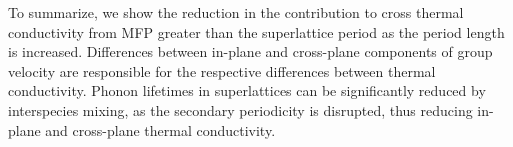 





To summarize, we show the reduction in the contribution to cross thermal conductivity from MFP greater than the superlattice period as the period length is increased. Differences between in-plane and cross-plane components of group velocity are responsible for the respective differences between thermal conductivity. Phonon lifetimes in superlattices can be significantly reduced by interspecies mixing, as the secondary periodicity is disrupted, thus reducing in-plane and cross-plane thermal conductivity. 


